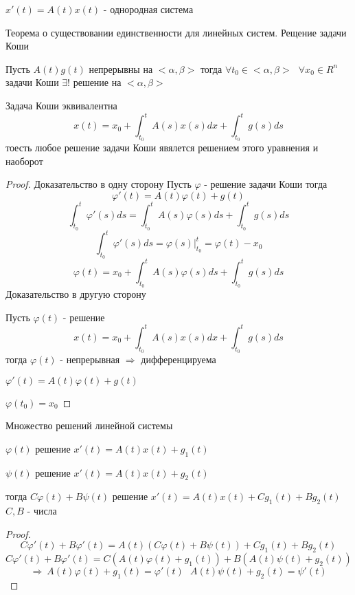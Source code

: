 $x'(t) = A(t)x(t)$ - однородная система

\begin{title}[\Large]
  Теорема о существовании единственности для линейных систем. Рещение задачи
  Коши
\end{title}

\begin{theorem}
  Пусть $A(t) g(t)$ непрерывны на $<\alpha, \beta>$ тогда
  $\forall t_0 \in <\alpha, \beta> ~~~ \forall x_0 \in R^n$ задачи Коши
  $\exists !$ решение на $<\alpha, \beta>$
\end{theorem}

\begin{block}[Лемма]
  Задача Коши эквивалентна
  $$
  x(t) = x_0 + \int_{t_0}^t A(s)x(s)dx +
  \int_{t_0}^t g(s)ds
  $$
  тоесть любое решение задачи Коши явялется решением этого уравнения и наоборот
\end{block}

\begin{proof}
  Доказательство в одну сторону
  Пусть $\varphi$ - решение задачи Коши тогда
  $$
  \varphi'(t) = A(t)\varphi(t) + g(t)
  $$
  $$
  \int_{t_0}^t \varphi'(s)ds = \int_{t_0}^t A(s) \varphi(s)ds +
  \int_{t_0}^t g(s) ds
  $$
  $$
  \int_{t_0}^t \varphi'(s)ds = \varphi(s)|_{t_0}^t = \varphi(t) - x_0
  $$
  $$
  \varphi(t) = x_0 + \int_{t_0}^t A(s) \varphi(s) ds  + \int_{t_0}^t g(s)ds
  $$
  Доказательство в другую сторону

  Пусть $\varphi(t)$ - решение
  $$
  x(t) = x_0 + \int_{t_0}^t A(s)x(s)dx +
  \int_{t_0}^t g(s)ds
  $$
  тогда $\varphi(t)$ - непрерывная $\Rightarrow$ дифференцируема

  $\varphi'(t) = A(t)\varphi(t) + g(t)$

  $\varphi(t_0) = x_0$
\end{proof}

\begin{title}[\Large]
  Множество решений линейной системы
\end{title}

\begin{theorem}
  $\varphi(t)$ решение $x'(t) = A(t)x(t) + g_1(t)$

  $\psi(t)$ решение $x'(t) = A(t)x(t) + g_2(t)$

  тогда $C\varphi(t) + B\psi(t)$ решение $x'(t) = A(t)x(t) + Cg_1(t) + Bg_2(t)$
  $C,B$ - числа
\end{theorem}

\begin{proof}
  $$
  C\varphi'(t) + B\varphi'(t) = A(t)(C\varphi(t) + B\psi(t)) + Cg_1(t) +
  Bg_2(t)
  $$
  $$
  C\varphi'(t) + B\varphi'(t) = C(A(t)\varphi(t) + g_1(t))+
  B(A(t)\psi(t) + g_2(t))
  $$
  $$
  \Rightarrow ~ A(t)\varphi(t) + g_1(t) = \varphi'(t) ~~~
  A(t)\psi(t) + g_2(t) = \psi'(t)
  $$
\end{proof}

